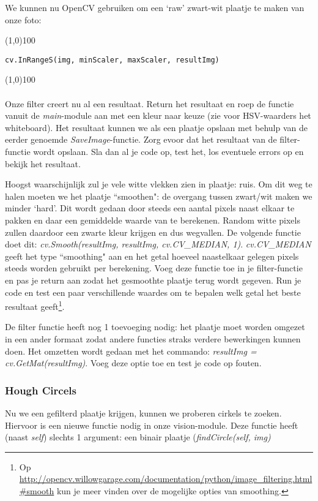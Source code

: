 \documentclass[a4paper]{article}
\begin{document}
We kunnen nu OpenCV gebruiken om een `raw' zwart-wit plaatje te maken van onze foto:

\noindent \line(1,0){100}
\begin{verbatim}
cv.InRangeS(img, minScaler, maxScaler, resultImg)
\end{verbatim}
\noindent \line(1,0){100}
\\\\
Onze filter creert nu al een resultaat. Return het resultaat en roep de functie vanuit de \textit{main}-module aan met een kleur naar keuze (zie voor HSV-waarders het whiteboard). 
Het resultaat kunnen we als een plaatje opslaan met behulp van de eerder genoemde \textit{SaveImage}-functie. Zorg evoor dat het resultaat van de filter-functie wordt opslaan. Sla dan al je code op, test het, los eventuele errors op en bekijk het resultaat.

Hoogst waarschijnlijk zul je vele witte vlekken zien in plaatje: ruis. Om dit weg te halen moeten we het plaatje ``smoothen": de overgang tussen zwart/wit maken we minder `hard'. Dit wordt gedaan door steeds een aantal pixels naast elkaar te pakken en daar een gemiddelde waarde van te berekenen. Random witte pixels zullen daardoor een zwarte kleur krijgen en dus wegvallen. De volgende functie doet dit: \textit{cv.Smooth(resultImg, resultImg, cv.CV\_MEDIAN, 1)}. \textit{cv.CV\_MEDIAN} geeft het type ``smoothing" aan en het getal hoeveel naastelkaar gelegen pixels steeds worden gebruikt per berekening. Voeg deze functie toe in je filter-functie en pas je return aan zodat het gesmoothte plaatje terug wordt gegeven. 
Run je code en test een paar verschillende waardes om te bepalen welk getal het beste resultaat geeft\footnote{Op \url{http://opencv.willowgarage.com/documentation/python/image_filtering.html\#smooth} kun je meer vinden over de mogelijke opties van smoothing.}.

De filter functie heeft nog 1 toevoeging nodig: het plaatje moet worden omgezet in een ander formaat zodat andere functies straks verdere bewerkingen kunnen doen. Het omzetten wordt gedaan met het commando: \textit{resultImg = cv.GetMat(resultImg)}. Voeg deze optie toe en test je code op fouten.

\subsubsection{Hough Circels}
Nu we een gefilterd plaatje krijgen, kunnen we proberen cirkels te zoeken. Hiervoor is een nieuwe functie nodig in onze vision-module. Deze functie heeft (naast \textit{self}) slechts 1 argument: een binair plaatje (\textit{findCircle(self, img)}
\end{document}
